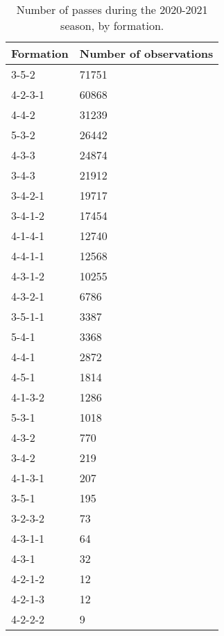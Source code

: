 \begin{table}[!htbp]
\centering
\caption{Number of passes during the 2020-2021 season,
by formation.}
\begin{tabular}{@{}ll}
\toprule
Formation & Number of observations \\ \midrule
3-5-2          & 71751                  \\
4-2-3-1        & 60868                  \\
4-4-2          & 31239                  \\
5-3-2          & 26442                  \\
4-3-3          & 24874                  \\
3-4-3          & 21912                  \\
3-4-2-1        & 19717                  \\
3-4-1-2        & 17454                  \\
4-1-4-1        & 12740                  \\
4-4-1-1        & 12568                  \\
4-3-1-2        & 10255                  \\
4-3-2-1        & 6786                   \\
3-5-1-1        & 3387                   \\
5-4-1          & 3368                   \\
4-4-1          & 2872                   \\
4-5-1          & 1814                   \\
4-1-3-2        & 1286                   \\
5-3-1          & 1018                   \\
4-3-2          & 770                    \\
3-4-2          & 219                    \\
4-1-3-1        & 207                    \\
3-5-1          & 195                    \\
3-2-3-2        & 73                     \\
4-3-1-1        & 64                     \\
4-3-1          & 32                     \\
4-2-1-2        & 12                     \\
4-2-1-3        & 12                     \\
4-2-2-2        & 9                      \\ \bottomrule
\end{tabular}

\label{tab:formation_rank}
\end{table}
